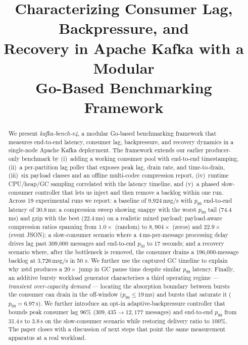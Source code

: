 \documentclass[conference]{IEEEtran}
\begin{document}
\title{Characterizing Consumer Lag, Backpressure, and \\
Recovery in Apache Kafka with a Modular \\
Go-Based Benchmarking Framework}

\author{
}

\maketitle

\begin{abstract}
We present \emph{kafka-bench-v4}, a modular Go-based benchmarking
framework that measures end-to-end latency, consumer lag,
backpressure, and recovery dynamics in a single-node Apache Kafka
deployment. The framework extends our earlier producer-only benchmark
by (i)~adding a working consumer pool with end-to-end timestamping,
(ii)~a per-partition lag poller that exposes peak lag, drain rate, and
time-to-drain, (iii)~six payload classes and an offline
multi-codec compression report, (iv)~runtime CPU/heap/GC sampling
correlated with the latency timeline, and (v)~a phased slow-consumer
controller that lets us inject and then remove a backlog within one
run. Across 19 experimental runs we report: a baseline of
9{,}924\,msg/s with $p_{99}$ end-to-end latency of 30.8\,ms; a
compression sweep showing snappy with the worst $p_{99}$ tail
(74.4\,ms) and gzip with the best (22.4\,ms) on a realistic mixed
payload; payload-aware compression ratios spanning from
$1.0\times$ (random) to $8{,}904\times$ (zeros) and $22.9\times$ (event
JSON); a slow-consumer scenario where a 4\,ms-per-message processing
delay drives lag past 309{,}000 messages and end-to-end $p_{50}$
to 17 seconds; and a recovery scenario where, after the bottleneck is
removed, the consumer drains a 196{,}000-message backlog at
3{,}726\,msg/s in 50 s. We further use the captured GC timeline to
explain why zstd produces a $20\times$ jump in GC pause time despite
similar $p_{99}$ latency. Finally, an additive bursty workload
generator characterises a third operating regime ---
\emph{transient over-capacity demand} --- locating the absorption
boundary between bursts the consumer can drain in the off-window
($p_{99} \le 19$\,ms) and bursts that saturate it
($p_{99} = 6.97$\,s). We further introduce an opt-in
adaptive-backpressure controller that bounds peak consumer lag $96\%$
($309{,}435 \to 12{,}177$ messages) and end-to-end $p_{99}$ from
31.4\,s to 3.8\,s on the slow-consumer scenario while restoring
delivery ratio to $100\%$. The paper closes with a discussion of
next steps that point the same measurement apparatus at a real
workload.
\end{abstract}
\end{document}

